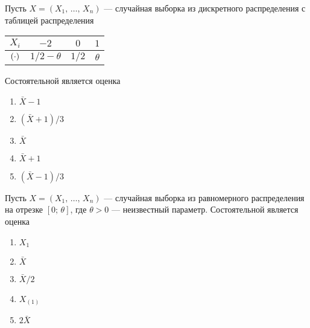 \documentclass[t]{beamer}
\let\P\relax
\DeclareMathOperator{\P}{\mathbb{P}}
\begin{document}
 \begin{frame} \label{28} 
\begin{block}{28} 

    Пусть $X = (X_1, \, \ldots, \, X_n)$ — случайная выборка из дискретного распределения с таблицей распределения
    
  \begin{center}
  \begin{tabular}{cccc}
    \toprule
    $X_i$    & $-2$     & $0$   & $1$  \\
    \midrule
    $\P(\cdot)$        & $1/2 - \theta$      & $1/2$    & $\theta$  \\
    \bottomrule
  \end{tabular}
\end{center}

Состоятельной является оценка


 \end{block} 
\begin{enumerate} 
\item[] \hyperlink{28-No}{\beamergotobutton{} $\bar{X} - 1$}
\item[] \hyperlink{28-Yes}{\beamergotobutton{} $(\bar{X} + 1) / 3$}
\item[] \hyperlink{28-No}{\beamergotobutton{} $\bar{X}$}
\item[] \hyperlink{28-No}{\beamergotobutton{} $\bar{X} + 1$}
\item[] \hyperlink{28-No}{\beamergotobutton{} $(\bar{X} - 1) / 3$}
\end{enumerate} 
\end{frame} 


 \begin{frame} \label{29} 
\begin{block}{29} 

  Пусть $X = (X_1, \, \ldots, \, X_n)$ — случайная выборка из равномерного распределения на отрезке $[0; \, \theta]$, где $\theta > 0$ — неизвестный параметр.
  Состоятельной является оценка


 \end{block} 
\begin{enumerate} 
\item[] \hyperlink{29-No}{\beamergotobutton{} $X_1$}
\item[] \hyperlink{29-No}{\beamergotobutton{} $\bar{X}$}
\item[] \hyperlink{29-No}{\beamergotobutton{} $\bar{X} / 2$}
\item[] \hyperlink{29-No}{\beamergotobutton{} $X_{(1)}$}
\item[] \hyperlink{29-Yes}{\beamergotobutton{} $2 \bar{X}$}
\end{enumerate} 
\end{frame} 
\end{document}
